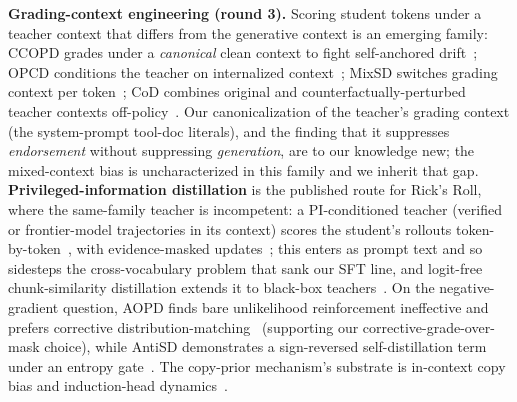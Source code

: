 \documentclass[11pt]{article}
\begin{document}
\textbf{Grading-context engineering (round 3).} Scoring student tokens under a teacher context
that differs from the generative context is an emerging family: CCOPD grades under a
\emph{canonical} clean context to fight self-anchored drift~\cite{ccopd}; OPCD conditions the
teacher on internalized context~\cite{opcd}; MixSD switches grading context per token~\cite{mixsd};
CoD combines original and counterfactually-perturbed teacher contexts off-policy~\cite{cod}. Our
canonicalization of the teacher's grading context (the system-prompt tool-doc literals), and the
finding that it suppresses \emph{endorsement} without suppressing \emph{generation}, are
to our knowledge new; the mixed-context bias is uncharacterized in this family and we inherit that
gap. \textbf{Privileged-information distillation} is the published route for Rick's Roll, where
the same-family teacher is incompetent: a PI-conditioned teacher (verified or frontier-model
trajectories in its context) scores the student's rollouts token-by-token~\cite{pidistill,opsd},
with evidence-masked updates~\cite{edgeopd}; this enters as prompt text and so sidesteps the
cross-vocabulary problem that sank our SFT line, and logit-free chunk-similarity distillation
extends it to black-box teachers~\cite{omniopd}. On the negative-gradient question, AOPD finds bare
unlikelihood reinforcement ineffective and prefers corrective distribution-matching~\cite{aopd}
(supporting our corrective-grade-over-mask choice), while AntiSD demonstrates a sign-reversed
self-distillation term under an entropy gate~\cite{antisd}. The copy-prior mechanism's substrate
is in-context copy bias and induction-head dynamics~\cite{copybias,repetitioncurse}.
\end{document}
